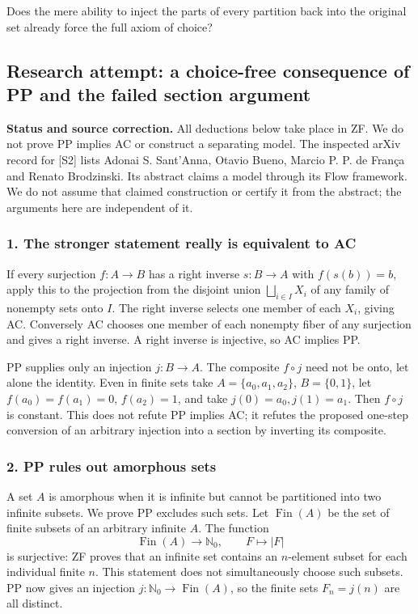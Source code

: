 \documentclass[11pt,a4paper]{article}
\begin{document}
Does the mere ability to inject the parts of every partition back into the original set already force the full axiom of choice?

\subsection{Research attempt: a choice-free consequence of PP and the failed section argument}
\textbf{Status and source correction.} All deductions below take place in ZF. We do not prove PP implies AC or construct a separating model. The inspected arXiv record for [S2] lists Adonai S. Sant'Anna, Otavio Bueno, Marcio P. P. de França and Renato Brodzinski. Its abstract claims a model through its Flow framework. We do not assume that claimed construction or certify it from the abstract; the arguments here are independent of it.

\subsubsection{1. The stronger statement really is equivalent to AC}
If every surjection $f:A\to B$ has a right inverse $s:B\to A$ with $f(s(b))=b$, apply this to the projection from the disjoint union $\bigsqcup_{i\in I}X_i$ of any family of nonempty sets onto $I$. The right inverse selects one member of each $X_i$, giving AC. Conversely AC chooses one member of each nonempty fiber of any surjection and gives a right inverse. A right inverse is injective, so AC implies PP.

PP supplies only an injection $j:B\to A$. The composite $f\circ j$ need not be onto, let alone the identity. Even in finite sets take $A=\{a_0,a_1,a_2\}$, $B=\{0,1\}$, let $f(a_0)=f(a_1)=0$, $f(a_2)=1$, and take $j(0)=a_0,j(1)=a_1$. Then $f\circ j$ is constant. This does not refute PP implies AC; it refutes the proposed one-step conversion of an arbitrary injection into a section by inverting its composite.

\subsubsection{2. PP rules out amorphous sets}
A set $A$ is amorphous when it is infinite but cannot be partitioned into two infinite subsets. We prove PP excludes such sets. Let $\operatorname{Fin}(A)$ be the set of finite subsets of an arbitrary infinite $A$. The function
\[\operatorname{Fin}(A)\longrightarrow\mathbb N_0,\qquad F\longmapsto|F|
\]
is surjective: ZF proves that an infinite set contains an $n$-element subset for each individual finite $n$. This statement does not simultaneously choose such subsets. PP now gives an injection $j:\mathbb N_0\to\operatorname{Fin}(A)$, so the finite sets $F_n=j(n)$ are all distinct.
\end{document}
